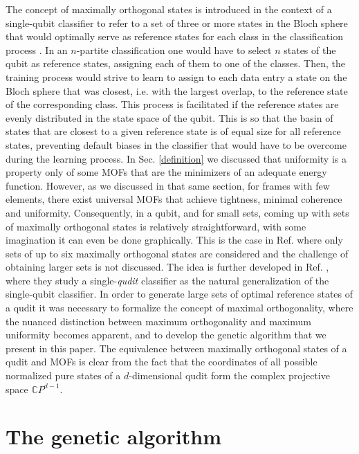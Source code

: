 \documentclass[%
superscriptaddress,
amsmath,amssymb,
 aps,
pra,
floatfix,
]{revtex4-2}
\begin{document}
The concept of maximally orthogonal states is introduced in the context of a single-qubit classifier to refer to a set of three or more states in the Bloch sphere that would optimally serve as reference states for each class in the classification process \cite{perezsalinas2020data}. In an $n$-partite classification one would have to select $n$ states of the qubit as reference states, assigning each of them to one of the classes. Then, the training process would strive to learn to assign to each data entry a state on the Bloch sphere that was closest, i.e. with the largest overlap, to the reference state of the corresponding class. This process is facilitated if the reference states are evenly distributed in the state space of the qubit. This is so that the basin of states that are closest to a given reference state is of equal size for all reference states, preventing default biases in the classifier that would have to be overcome during the learning process.  In Sec. \ref{definition} we discussed that uniformity is a property only of some MOFs that are the minimizers of an adequate energy function. However, as we discussed in that same section, for frames with few elements, there exist universal MOFs that achieve tightness, minimal coherence and uniformity. Consequently, in a qubit, and for small sets, coming up with sets of maximally orthogonal states is relatively straightforward, with some imagination it can even be done graphically. This is the case in Ref. \cite{perezsalinas2020data} where only sets of up to six maximally orthogonal states are considered and the challenge of obtaining larger sets is not discussed. The idea is further developed in Ref. \cite{rocajerat2024qudit}, where they study a single-\emph{qudit} classifier as the natural generalization of the single-qubit classifier. In order to generate large sets of optimal reference states of a qudit it was necessary to formalize the concept of maximal orthogonality, where the nuanced distinction between maximum orthogonality and maximum uniformity becomes apparent, and to develop the genetic algorithm that we present in this paper. The equivalence between maximally orthogonal states of a qudit and MOFs is clear from the fact that the coordinates of all possible normalized pure states of a $d$-dimensional qudit form the complex projective space $\mathbb CP^{d-1}$.

\section{The genetic algorithm}
\label{algorithm}
\end{document}
